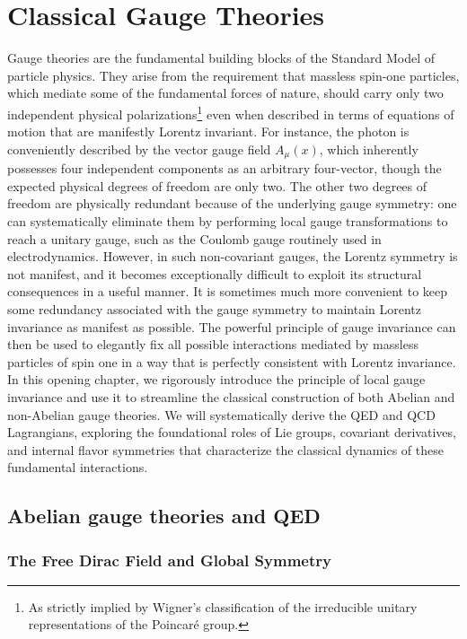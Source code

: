 \chapter{Classical Gauge Theories}

Gauge theories are the fundamental building blocks of the Standard Model of particle physics. They arise from the requirement that massless spin-one particles, which mediate some of the fundamental forces of nature, should carry only two independent physical polarizations\footnote{As strictly implied by Wigner's classification of the irreducible unitary representations of the Poincaré group.} even when described in terms of equations of motion that are manifestly Lorentz invariant. For instance, the photon is conveniently described by the vector gauge field \(A_\mu(x)\), which inherently possesses four independent components as an arbitrary four-vector, though the expected physical degrees of freedom are only two. The other two degrees of freedom are physically redundant because of the underlying gauge symmetry: one can systematically eliminate them by performing local gauge transformations to reach a unitary gauge, such as the Coulomb gauge routinely used in electrodynamics. However, in such non-covariant gauges, the Lorentz symmetry is not manifest, and it becomes exceptionally difficult to exploit its structural consequences in a useful manner. It is sometimes much more convenient to keep some redundancy associated with the gauge symmetry to maintain Lorentz invariance as manifest as possible. The powerful principle of gauge invariance can then be used to elegantly fix all possible interactions mediated by massless particles of spin one in a way that is perfectly consistent with Lorentz invariance. In this opening chapter, we rigorously introduce the principle of local gauge invariance and use it to streamline the classical construction of both Abelian and non-Abelian gauge theories. We will systematically derive the QED and QCD Lagrangians, exploring the foundational roles of Lie groups, covariant derivatives, and internal flavor symmetries that characterize the classical dynamics of these fundamental interactions.

\section{Abelian gauge theories and QED}

\subsection{The Free Dirac Field and Global Symmetry}

